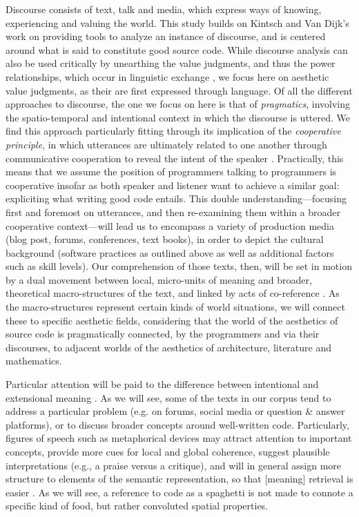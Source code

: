Discourse consists of text, talk and media, which express ways of knowing, experiencing and valuing the world. This study builds on Kintsch and Van Dijk's work on providing tools to analyze an instance of discourse, and is centered around what is said to constitute good source code. While discourse analysis can also be used critically by unearthing the value judgments, and thus the power relationships, which occur in linguistic exchange \citep{mullet_general_2018}, we focus here on aesthetic value judgments, as their are first expressed through language. Of all the different approaches to discourse, the one we focus on here is that of \emph{pragmatics}, involving the spatio-temporal and intentional context in which the discourse is uttered. We find this approach particularly fitting through its implication of the \emph{cooperative principle}, in which utterances are ultimately related to one another through communicative cooperation to reveal the intent of the speaker \citep{schiffrin_approaches_1994}. Practically, this means that we assume the position of programmers talking to programmers is cooperative insofar as both speaker and listener want to achieve a similar goal: expliciting what writing good code entails. This double understanding—focusing first and foremost on utterances, and then re-examining them within a broader cooperative context—will lead us to encompass a variety of production media (blog post, forums, conferences, text books), in order to depict the cultural background (software practices as outlined above as well as additional factors such as skill levels). Our comprehension of those texts, then, will be set in motion by a dual movement between local, micro-units of meaning and broader, theoretical macro-structures of the text, and linked by acts of co-reference \citep{kintsch_model_1978}. As the macro-structures represent certain kinds of world situations, we will connect these to specific aesthetic fields, considering that the world of the aesthetics of source code is pragmatically connected, by the programmers and via their discourses, to adjacent worlds of the aesthetics of architecture, literature and mathematics. 

Particular attention will be paid to the difference between intentional and extensional meaning \citep{dijk_strategies_1983b}. As we will see, some of the texts in our corpus tend to address a particular problem (e.g. on forums, social media or question \& answer platforms), or to discuss broader concepts around well-written code. Particularly, figures of speech such as metaphorical devices may attract attention to important concepts, provide more cues for local and global coherence, suggest plausible interpretations (e.g., a praise versus a critique), and will in general assign more structure to elements of the semantic representation, so that [meaning] retrieval is easier \citep{dijk_strategies_1983b}. As we will see, a reference to code as a spaghetti is not made to connote a specific kind of food, but rather convoluted spatial properties.

